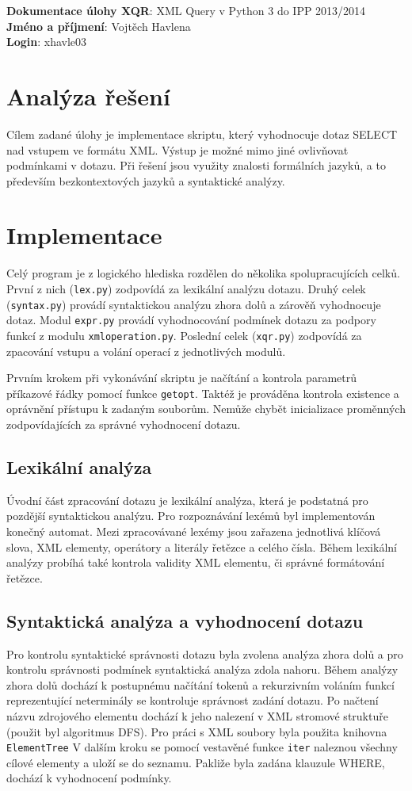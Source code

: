 \documentclass[a4paper,10pt]{article}
\begin{document}
\noindent
\textbf{Dokumentace úlohy XQR}: XML Query v Python 3 do IPP 2013/2014\\
\textbf{Jméno a příjmení}: Vojtěch Havlena\\
\textbf{Login}: xhavle03

\section{Analýza řešení}
Cílem zadané úlohy je implementace skriptu, který vyhodnocuje dotaz SELECT nad 
vstupem ve formátu XML. Výstup je možné mimo jiné ovlivňovat podmínkami v dotazu.
Při řešení jsou využity znalosti formálních jazyků, a to především bezkontextových jazyků
a syntaktické analýzy.

\section{Implementace}
Celý program je z logického hlediska rozdělen do několika spolupracujících celků. První z nich 
(\texttt{lex.py}) zodpovídá za lexikální analýzu dotazu. Druhý celek (\texttt{syntax.py})
provádí syntaktickou analýzu zhora dolů a zárověň vyhodnocuje dotaz. Modul \texttt{expr.py}
provádí vyhodnocování podmínek dotazu za podpory funkcí z modulu \texttt{xmloperation.py}.
Poslední celek (\texttt{xqr.py}) zodpovídá za zpacování vstupu a volání operací z 
jednotlivých modulů.

Prvním krokem při vykonávání skriptu je načítání a kontrola parametrů příkazové řádky pomocí
funkce \texttt{getopt}. Taktéž je prováděna kontrola existence a oprávnění přístupu k 
zadaným souborům. Nemůže chybět inicializace proměnných zodpovídajících za správné vyhodnocení
dotazu.

\subsection{Lexikální analýza}
Úvodní část zpracování dotazu je lexikální analýza, která je podstatná pro pozdější syntaktickou analýzu. 
Pro rozpoznávání lexémů byl implementován konečný automat. Mezi zpracovávané lexémy jsou zařazena 
jednotlivá klíčová slova, XML elementy, operátory a literály řetězce a celého čísla. Během 
lexikální analýzy probíhá také kontrola validity XML elementu, či správné formátování řetězce.

\subsection{Syntaktická analýza a vyhodnocení dotazu}
Pro kontrolu syntaktické správnosti dotazu byla zvolena analýza zhora dolů a pro kontrolu správnosti podmínek
syntaktická analýza zdola nahoru. Během analýzy zhora dolů dochází k postupnému načítání tokenů a rekurzivním
voláním funkcí reprezentující neterminály se kontroluje správnost zadání dotazu. Po načtení názvu zdrojového
elementu dochází k jeho nalezení v XML stromové struktuře (použit byl algoritmus DFS). Pro práci s XML soubory 
byla použita knihovna \texttt{ElementTree} V dalším kroku se pomocí vestavěné funkce \texttt{iter} naleznou 
všechny cílové elementy a uloží se do seznamu. Pakliže byla zadána klauzule WHERE, dochází k 
vyhodnocení podmínky.
\end{document}
